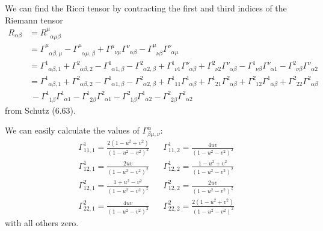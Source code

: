\documentclass[a4paper]{article} %
\newcommand{\ph}[1]{\phantom{#1}}
\begin{document}
We can find the Ricci tensor by contracting the first and third indices of the Riemann tensor
\begin{align}
R_{\alpha\beta}&=R^{\mu}_{\phantom{\mu}\alpha\mu\beta}\\
&=\Gamma^{\mu}_{\phantom{\mu}\alpha\beta,\mu}-\Gamma^{\mu}_{\phantom{\mu}\alpha\mu,\beta}
+\Gamma^{\mu}_{\phantom{\mu}\nu\mu}\Gamma^{\nu}_{\phantom{\nu}\alpha\beta}
-\Gamma^{\mu}_{\phantom{\mu}{\nu\beta}}\Gamma^{\nu}_{\phantom{\nu}\alpha\mu}\\
&=\Gamma^{1}_{\ph{1}\alpha\beta,1}+\Gamma^{2}_{\ph{2}\alpha \beta,2}
-\Gamma^{1}_{\ph{1}\alpha 1,\beta}-\Gamma^{2}_{\ph{2}\alpha 2,\beta}
+\Gamma^{1}_{\ph{1}\nu 1} \Gamma^{\nu}_{\ph{\nu}{\alpha\beta}}
+\Gamma^{2}_{\ph{1}\nu 2} \Gamma^{\nu}_{\ph{\nu}{\alpha\beta}}
-\Gamma^{1}_{\ph{1}\nu \beta}\Gamma^{\nu}_{\ph{\nu}\alpha 1}
-\Gamma^{2}_{\ph{2}\nu\beta}\Gamma^{\nu}_{\ph{\nu}\alpha 2}\\
&=\Gamma^{1}_{\ph{1}\alpha\beta,1}+\Gamma^{2}_{\ph{2}\alpha \beta,2}
-\Gamma^{1}_{\ph{1}\alpha 1,\beta}-\Gamma^{2}_{\ph{2}\alpha 2,\beta}
+\Gamma^{1}_{\ph{1}1 1} \Gamma^{1}_{\ph{1}{\alpha\beta}}
+\Gamma^{1}_{\ph{1}2 1} \Gamma^{2}_{\ph{2}{\alpha\beta}}
+\Gamma^{2}_{\ph{1}1 2} \Gamma^{1}_{\ph{1}{\alpha\beta}}
+\Gamma^{2}_{\ph{1}2 2} \Gamma^{2}_{\ph{2}{\alpha\beta}}\nonumber\\
&~-\Gamma^{1}_{\ph{1}1\beta}\Gamma^{1}_{\ph{1}\alpha 1}
-\Gamma^{1}_{\ph{2}2 \beta}\Gamma^{2}_{\ph{2}\alpha 1}
-\Gamma^{2}_{\ph{2}1 \beta}\Gamma^{1}_{\ph{1}\alpha 2}
-\Gamma^{2}_{\ph{2}2 \beta}\Gamma^{2}_{\ph{2}\alpha 2}\label{Rab from Schutz}
\end{align}
from Schutz (6.63).

We can easily calculate the values of $\Gamma^{\alpha}_{\beta\mu,\nu}$:
\begin{align}
\Gamma^{1}_{11,1}=\frac{2(1-u^2+v^2)}{(1-u^2-v^2)^2}&&
\Gamma^{1}_{11,2}=\frac{4uv}{(1-u^2-v^2)^2}\\
\Gamma^{1}_{12,1}=\frac{2uv}{(1-u^2-v^2)^2}&&
\Gamma^{1}_{12,2}=\frac{1-u^2+v^2}{(1-u^2-v^2)^2}\\
\Gamma^{2}_{12,1}=\frac{1+u^2-v^2}{(1-u^2-v^2)^2}&&
\Gamma^{2}_{12,2}=\frac{2uv}{(1-u^2-v^2)^2}\\
\Gamma^{2}_{22,1}=\frac{4uv}{(1-u^2-v^2)^2}&&
\Gamma^{2}_{22,2}=\frac{2(1-u^2+v^2)}{(1-u^2-v^2)^2}
\end{align}
with all others zero.

\end{document}
